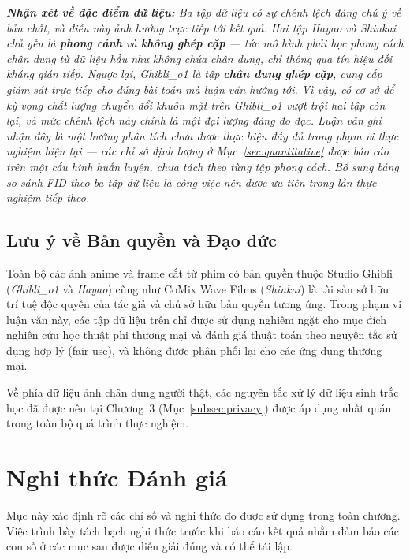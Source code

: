 \medskip
\noindent\textit{\textbf{Nhận xét về đặc điểm dữ liệu:} Ba tập dữ liệu có sự chênh lệch đáng chú ý về bản chất, và điều này ảnh hưởng trực tiếp tới kết quả. Hai tập Hayao và Shinkai chủ yếu là \textbf{phong cảnh} và \textbf{không ghép cặp} --- tức mô hình phải học phong cách chân dung từ dữ liệu hầu như không chứa chân dung, chỉ thông qua tín hiệu đối kháng gián tiếp. Ngược lại, Ghibli\_o1 là tập \textbf{chân dung ghép cặp}, cung cấp giám sát trực tiếp cho đúng bài toán mà luận văn hướng tới. Vì vậy, có cơ sở để kỳ vọng chất lượng chuyển đổi khuôn mặt trên Ghibli\_o1 vượt trội hai tập còn lại, và mức chênh lệch này chính là một đại lượng đáng đo đạc. Luận văn ghi nhận đây là một hướng phân tích chưa được thực hiện đầy đủ trong phạm vi thực nghiệm hiện tại --- các chỉ số định lượng ở Mục~\ref{sec:quantitative} được báo cáo trên một cấu hình huấn luyện, chưa tách theo từng tập phong cách. Bổ sung bảng so sánh FID theo ba tập dữ liệu là công việc nên được ưu tiên trong lần thực nghiệm tiếp theo.}

\subsection{Lưu ý về Bản quyền và Đạo đức}
\label{subsec:copyright}

Toàn bộ các ảnh anime và frame cắt từ phim có bản quyền thuộc Studio Ghibli (\textit{Ghibli\_o1} và \textit{Hayao}) cũng như CoMix Wave Films (\textit{Shinkai}) là tài sản sở hữu trí tuệ độc quyền của tác giả và chủ sở hữu bản quyền tương ứng. Trong phạm vi luận văn này, các tập dữ liệu trên chỉ được sử dụng nghiêm ngặt cho mục đích nghiên cứu học thuật phi thương mại và đánh giá thuật toán theo nguyên tắc sử dụng hợp lý (fair use), và không được phân phối lại cho các ứng dụng thương mại.

Về phía dữ liệu ảnh chân dung người thật, các nguyên tắc xử lý dữ liệu sinh trắc học đã được nêu tại Chương~3 (Mục~\ref{subsec:privacy}) được áp dụng nhất quán trong toàn bộ quá trình thực nghiệm.

\section{Nghi thức Đánh giá}
\label{sec:protocol}

Mục này xác định rõ các chỉ số và nghi thức đo được sử dụng trong toàn chương. Việc trình bày tách bạch nghi thức trước khi báo cáo kết quả nhằm đảm bảo các con số ở các mục sau được diễn giải đúng và có thể tái lập.


